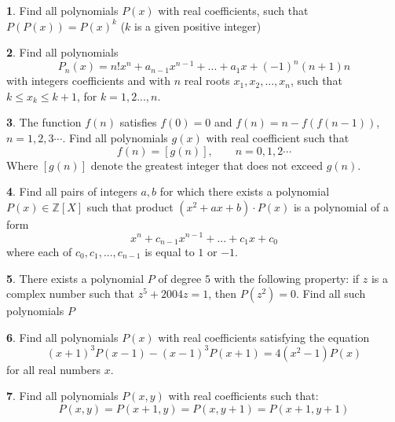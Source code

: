 \documentclass{article}
\theoremstyle{definition}
\newtheorem{p}{}
\begin{document}
\begin{p}
Find all polynomials $P(x)$ with real coefficients, such that $P(P(x))=P(x)^k$ ($k$ is a given positive integer)
\end{p}





\begin{p}
Find all polynomials 
\[P_{n}(x)=n!x^n + a_{n-1}x^{n-1}+...+ a_{1}x +(-1)^n(n+1)n\]
with integers coefficients and with $n$ real roots $x_1, x_2, ..., x_n$, such that $k\leq x_k\leq k+1$, for $k=1,2...,n$.
\end{p}





\begin{p}
The function $f(n)$ satisfies $f(0)=0$ and $f(n)=n-f \left( f(n-1) \right)$, $n=1,2,3 \cdots$. Find all polynomials $g(x)$ with real coefficient such that
\[ f(n)= [ g(n) ], \qquad n=0,1,2 \cdots \]
Where $[ g(n) ]$ denote the greatest integer that does not exceed $g(n)$.
\end{p}





\begin{p}
Find all pairs of integers $a,b$ for which there exists a polynomial $P(x) \in \mathbb{Z}[X]$ such that product $(x^2+ax+b)\cdot P(x)$ is a polynomial of a form \[ x^n+c_{n-1}x^{n-1}+...+c_1x+c_0  \] where each of $c_0,c_1,...,c_{n-1}$ is equal to $1$ or $-1$.
\end{p}





\begin{p}
There exists a polynomial $P$ of degree $5$ with the following property: if $z$ is a complex number such that $z^{5}+2004z=1$, then $P(z^{2})=0$. Find all such polynomials $P$
\end{p}





\begin{p}
Find all polynomials $P(x)$ with real coefficients satisfying the equation \[(x+1)^{3}P(x-1)-(x-1)^{3}P(x+1)=4(x^{2}-1) P(x)\] for all real numbers $x$.
\end{p}


\begin{p}
Find all polynomials $P(x,y)$ with real coefficients such that:
\[P(x,y)=P(x+1,y)=P(x,y+1)=P(x+1,y+1)\]
\end{p}
\end{document}
